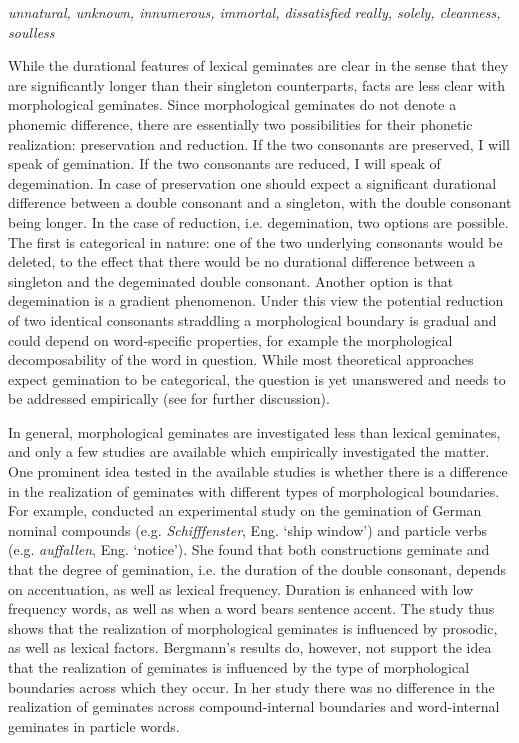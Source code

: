 \begin{exe} 
	\ex \label{example gemination 1} \textit{unnatural, unknown, innumerous, immortal, dissatisfied}
	\ex \label{example gemination 2}\textit{really, solely, cleanness, soulless}
\end{exe}

While the durational features of lexical geminates are clear in the sense that they are significantly longer than their singleton counterparts, facts are less clear with morphological geminates. Since morphological geminates do not denote a phonemic difference, there are essentially two possibilities for their phonetic realization: preservation and reduction. If the two consonants are preserved, I will speak of gemination. If the two consonants are reduced, I will speak of degemination. 
In case of preservation one should expect a significant durational difference between a double consonant and a singleton, with the double consonant being longer.	
In the case of reduction, i.e. degemination, two options are possible. The first is categorical in nature: one of the two underlying consonants would be deleted, to the effect that there would be no durational difference between a singleton and the degeminated double consonant.
Another option is that degemination is a gradient phenomenon. Under this view the potential reduction of two identical consonants straddling a morphological boundary is gradual and could depend on word-specific properties, for example the morphological decomposability of the word in question. 
While most theoretical approaches expect gemination to be categorical, the question is yet unanswered and needs to be addressed empirically (see  for further discussion).

In general, morphological geminates are investigated less than lexical geminates, and only a few studies are available which empirically investigated the matter. One prominent idea tested in the available studies is whether there is a difference in the realization of geminates with different types of morphological boundaries.
 For example, \cite{Bergmann.2017} conducted an experimental study on the gemination of German nominal compounds (e.g. \textit{Schifffenster}, Eng. ‘{ship window}') and  particle verbs (e.g. \textit{auffallen}, Eng.  ‘{notice}'). She found that both constructions geminate and that the degree of gemination, i.e. the duration of the double consonant, depends on accentuation, as well as lexical frequency. Duration is enhanced with low frequency words, as well as when a word bears sentence accent. The study thus shows that the realization of morphological geminates is influenced by prosodic, as well as lexical factors. Bergmann's results do, however, not support the idea that the realization of geminates is influenced by the type of morphological boundaries across which they occur. In her study there was no difference in the realization of geminates across compound-internal boundaries and word-internal geminates in particle words.


